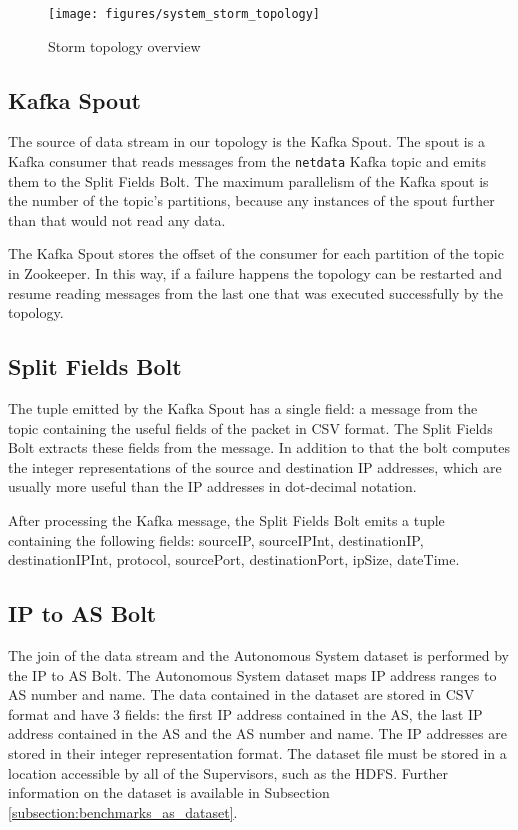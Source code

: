 \begin{figure}[h!]
\centering
\texttt{[image: figures/system\_storm\_topology]}
\caption{Storm topology overview}
\label{figure:system_storm_topology}
\end{figure}

\subsection{Kafka Spout}

The source of data stream in our topology is the Kafka Spout. The spout is a Kafka consumer that reads messages from the \texttt{netdata} Kafka topic and emits them to the Split Fields Bolt. The maximum parallelism of the Kafka spout is the number of the topic's partitions, because any instances of the spout further than that would not read any data.

The Kafka Spout stores the offset of the consumer for each partition of the topic in Zookeeper. In this way, if a failure happens the topology can be restarted and resume reading messages from the last one that was executed successfully by the topology.

\subsection{Split Fields Bolt}

The tuple emitted by the Kafka Spout has a single field: a message from the topic containing the useful fields of the packet in CSV format. The Split Fields Bolt extracts these fields from the message. In addition to that the bolt computes the integer representations of the source and destination IP addresses, which are usually more useful than the IP addresses in dot-decimal notation.

After processing the Kafka message, the Split Fields Bolt emits a tuple containing the following fields: sourceIP, sourceIPInt, destinationIP, destinationIPInt, protocol, sourcePort, destinationPort, ipSize, dateTime.

\subsection{IP to AS Bolt}

The join of the data stream and the Autonomous System dataset is performed by the IP to AS Bolt. The Autonomous System dataset maps IP address ranges to AS number and name. The data contained in the dataset are stored in CSV format and have 3 fields: the first IP address contained in the AS, the last IP address contained in the AS and the AS number and name. The IP addresses are stored in their integer representation format. The dataset file must be stored in a location accessible by all of the Supervisors, such as the HDFS. Further information on the dataset is available in Subsection \ref{subsection:benchmarks_as_dataset}.

